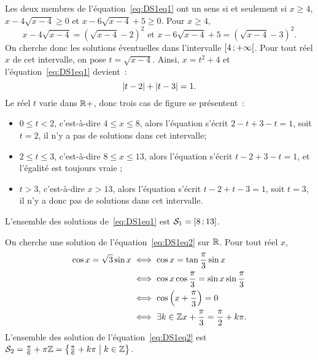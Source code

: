 \begin{corrige}
    Les deux membres de l'équation~\eqref{eq:DS1eq1} ont un sens si et seulement si \(x \geq 4\), \(x-4\sqrt{x-4} \geq 0\) et \(x-6\sqrt{x-4}+5\geq 0\). Pour \(x \geq 4\),
    \[x - 4\sqrt{x-4} = (\sqrt{x-4}-2)^2 \text{~et~} x-6\sqrt{x-4}+5 = (\sqrt{x-4}-3)^2.\]
    On cherche donc les solutions éventuelles dans l'intervalle \(\left[ 4 \, ;  +\infty \right[\). Pour tout réel \(x\) de cet intervalle, on pose \(t = \sqrt{x-4}\). Ainsi, \(x = t^2+4\) et l'équation~\eqref{eq:DS1eq1} devient~:
    \[\left\lvert t-2\right\rvert + \left\lvert t-3\right\rvert = 1.\] Le réel \(t\) varie dans \(\mathbb{R}+\), donc trois cas de figure se présentent~:
    \begin{itemize}
        \item \(0 \leq t < 2\), c'est-à-dire \(4\leq x \leq 8\),  alors l'équation s'écrit \(2-t+3-t=1\), soit \(t=2\), il n'y a pas de solutions dans cet intervalle;
        \item \(2 \leq t \leq 3\), c'est-à-dire \(8\leq x \leq 13\), alors l'équation s'écrit \(t-2+3-t=1\), et l'égalité est toujours vraie ;
        \item \(t > 3\), c'est-à-dire \(x > 13\), alors l'équation s'écrit \(t-2+t-3=1\), soit \(t=3\), il n'y a donc pas de solutions dans cet intervalle.
    \end{itemize}
    L'ensemble des solutions de~\eqref{eq:DS1eq1} est \(\mathcal{S}_1 = \left[ 8 \, ;  13 \right]\).

    On cherche une solution de l'équation~\eqref{eq:DS1eq2} sur \(\mathbb{R}\). Pour tout réel \(x\),
    \begin{align*}
        \cos x = \sqrt{3}\sin x &\iff \cos x = \tan\frac{\pi}{3} \sin x \\
                                &\iff \cos x \cos \frac{\pi}{3} = \sin x \sin\frac{\pi}{3} \\
                                &\iff \cos\left(x+\frac{\pi}{3}\right) = 0 \\
                                &\iff \exists k \in \mathbb{Z} x +\frac{\pi}{3} = \frac{\pi}{2}+k\pi.
    \end{align*}
    L'ensemble des solution de l'équation~\eqref{eq:DS1eq2} est \(\mathcal{S}_2 = \frac{\pi}{6}+\pi\mathbb{Z} = \left\{\frac{\pi}{6}+k\pi\mathrel{}\middle|\mathrel{}k \in \mathbb{Z}\right\}\).


\end{corrige}
